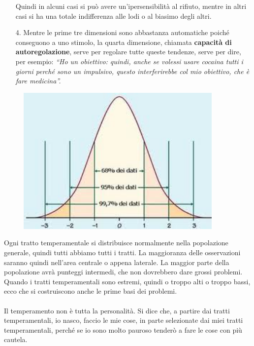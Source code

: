 \begin{itemize}
Quindi in alcuni casi si può avere un'ipersensibilità al rifiuto, mentre
in altri casi si ha una totale indifferenza alle lodi o al biasimo degli
altri.

\item[4.]
  Mentre le prime tre dimensioni sono abbastanza automatiche poiché
  conseguono a uno stimolo, la quarta dimensione, chiamata
  \textbf{capacità di autoregolazione}, serve per regolare tutte queste
  tendenze, serve per dire, per esempio: \emph{``Ho un obiettivo:
  quindi, anche se volessi usare cocaina tutti i giorni perché sono un
  impulsivo, questo interferirebbe col mio obiettivo, che è fare
  medicina''.}
\end{itemize}

\begin{figure}[!ht]
\centering
	\includegraphics[width=0.9\textwidth]{011/image2.png}
\end{figure}

Ogni
tratto temperamentale si distribuisce normalmente nella popolazione
generale, quindi tutti abbiamo tutti i tratti. La maggioranza delle
osservazioni saranno quindi nell'area centrale o appena laterale. La
maggior parte della popolazione avrà punteggi intermedi, che non
dovrebbero dare grossi problemi. Quando i tratti temperamentali sono
estremi, quindi o troppo alti o troppo bassi, ecco che si costruiscono
anche le prime basi dei problemi.
\\\\
Il temperamento non è tutta la personalità. Si dice che, a partire dai
tratti temperamentali, io nasco, faccio le mie cose, in parte
selezionate dai miei tratti temperamentali, perché se io sono molto
pauroso tenderò a fare le cose con più cautela.

